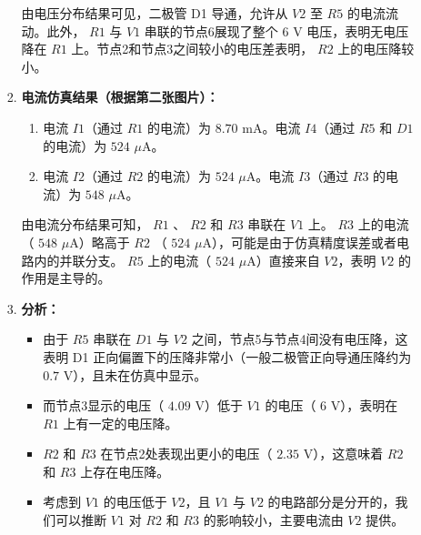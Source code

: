 \documentclass[dvipsnames, svgnames,a4paper,11pt]{article}
\begin{document}
\begin{enumerate}
\begin{enumerate}
\begin{enumerate}
				由电压分布结果可见，二极管 D1 导通，允许从 $V2$ 至 $R5$ 的电流流动。此外， $R1$ 与 $V1$ 串联的节点6展现了整个 $6$ V 电压，表明无电压降在 $R1$ 上。节点2和节点3之间较小的电压差表明， $R2$ 上的电压降较小。
				
				\item \textbf{电流仿真结果（根据第二张图片）：}
				
				\begin{enumerate}
					\item 电流 $I1$（通过 $R1$ 的电流）为 $8.70$ mA。电流 $I4$（通过 $R5$ 和 $D1$ 的电流）为 $524$ $\mu$A。
					\item 电流 $I2$（通过 $R2$ 的电流）为 $524$ $\mu$A。电流 $I3$（通过 $R3$ 的电流）为 $548$ $\mu$A。
				\end{enumerate}
				
				由电流分布结果可知， $R1$ 、 $R2$ 和 $R3$ 串联在 $V1$ 上。 $R3$ 上的电流（ $548$ $\mu$A）略高于 $R2$ （ $524$ $\mu$A），可能是由于仿真精度误差或者电路内的并联分支。 $R5$ 上的电流（ $524$ $\mu$A）直接来自 $V2$，表明 $V2$ 的作用是主导的。
				
				\item \textbf{分析：}
				\begin{itemize}
					\item 由于 $R5$ 串联在 $D1$ 与 $V2$ 之间，节点5与节点4间没有电压降，这表明 D1 正向偏置下的压降非常小（一般二极管正向导通压降约为 $0.7$ V），且未在仿真中显示。
					\item 而节点3显示的电压（ $4.09$ V）低于 $V1$ 的电压（ $6$ V），表明在 $R1$ 上有一定的电压降。
					\item $R2$ 和 $R3$ 在节点2处表现出更小的电压（ $2.35$ V），这意味着 $R2$ 和 $R3$ 上存在电压降。
					\item 考虑到 $V1$ 的电压低于 $V2$，且 $V1$ 与 $V2$ 的电路部分是分开的，我们可以推断 $V1$ 对 $R2$ 和 $R3$ 的影响较小，主要电流由 $V2$ 提供。
				\end{itemize}
			\end{enumerate}
			
		\end{enumerate}
		
	\end{enumerate}
	
	
		
\end{document}
